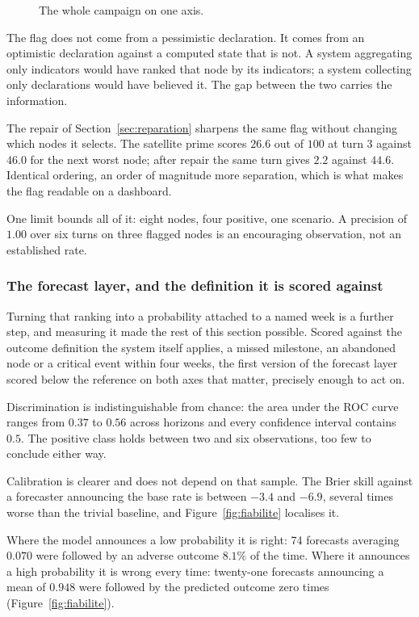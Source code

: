 \begin{figure}[H]
\begin{tikzpicture}[x=0.62cm, y=1cm,
    lab/.style  = {font=\scriptsize, text=altenNavy},
    note/.style = {font=\scriptsize\itshape, text=altenAzureDark, align=center},
    tick/.style = {font=\tiny, text=altenNavy}]
\end{tikzpicture}
\caption[The signal's useful window, on one axis]{The whole campaign on one axis.}
\label{fig:precoce}
\end{figure}

The flag does not come from a pessimistic declaration. It comes from an optimistic declaration
against a computed state that is not. A system aggregating only indicators would have ranked
that node by its indicators; a system collecting only declarations would have believed it. The
gap between the two carries the information.

The repair of Section~\ref{sec:reparation} sharpens the same flag without changing which nodes
it selects. The satellite prime scores $26.6$ out of $100$ at turn 3 against $46.0$ for the
next worst node; after repair the same turn gives $2.2$ against $44.6$. Identical ordering, an
order of magnitude more separation, which is what makes the flag readable on a dashboard.

One limit bounds all of it: eight nodes, four positive, one scenario. A precision of $1.00$
over six turns on three flagged nodes is an encouraging observation, not an established
rate.

\subsubsection{The forecast layer, and the definition it is scored against}

Turning that ranking into a probability attached to a named week is a further step, and
measuring it made the rest of this section possible. Scored against the outcome definition the
system itself applies, a missed milestone, an abandoned node or a critical event within four
weeks, the first version of the forecast layer scored below the reference on both axes that
matter, precisely enough to act on.

Discrimination is indistinguishable from chance: the area under the ROC curve ranges from
$0.37$ to $0.56$ across horizons and every confidence interval contains $0.5$. The positive
class holds between two and six observations, too few to conclude either way.

Calibration is clearer and does not depend on that sample. The Brier skill against a forecaster
announcing the base rate is between $-3.4$ and $-6.9$, several times worse than the trivial
baseline, and Figure~\ref{fig:fiabilite} localises it.

Where the model announces a low probability it is right: 74 forecasts averaging $0.070$ were
followed by an adverse outcome $8.1\%$ of the time. Where it announces a high probability it is
wrong every time: twenty-one forecasts announcing a mean of $0.948$ were followed by the
predicted outcome zero times (Figure~\ref{fig:fiabilite}).

